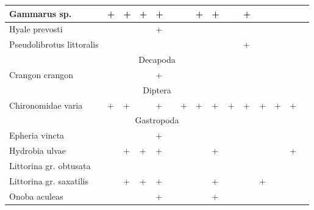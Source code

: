 \begin{footnotesize}
\begin{longtable}{|p{2cm}|p{0.4cm}p{0.4cm}|p{0.4cm}p{0.4cm}|p{0.4cm}p{0.4cm}|p{0.35cm}p{0.35cm}p{0.35cm}|p{1cm}|p{0.5cm}p{0.5cm}|p{1cm}|p{1cm}|}
Gammarus sp.              & +         & +         & +         & +         &           &           & +        & +        &          & +               &          &          &          &            \\  \hline
Hyale prevosti            &           &           &           & +         &           &           &          &          &          &                 &          &          &          &            \\  \hline
Pseudolibrotus littoralis &           &           &           &           &           &           &          &          &          & +               &          &          &          &            \\ \hline
\multicolumn{15}{|c|}{Decapoda} \\ \hline
Crangon crangon           &           &           &           & +         &           &           &          &          &          &                 &          &          &          &            \\ \hline
\multicolumn{15}{|c|}{Diptera} \\ \hline
Chironomidae varia        & +         & +         &           & +         &           & +         & +        & +        & +        & +               & +        & +        & +        &            \\ \hline
\multicolumn{15}{|c|}{Gastropoda} \\ \hline
Epheria vincta            &           &           &           & +         &           &           &          &          &          &                 &          &          &          &            \\  \hline
Hydrobia ulvae            &           & +         & +         & +         &           &           &          & +        &          &                 &          &          & +        &            \\  \hline
Littorina gr. obtusata    &           &           &           &           &           &           &          &          &          &                 &          &          &          &            \\  \hline
Littorina gr. saxatilis   &           & +         & +         & +         &           &           &          & +        &          &                 & +        &          &          &            \\  \hline
Onoba aculeas             &           &           &           & +         &           &           &          & +        &          &                 &          &          &          &            \\  \hline

\end{longtable}
\end{footnotesize}
